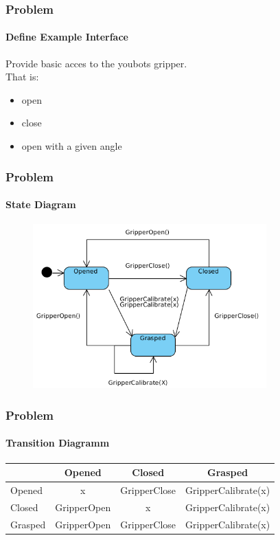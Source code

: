 \documentclass{beamer}
\begin{document}

\begin{frame}
\frametitle{Problem}
  \framesubtitle{Define Example Interface}
  Provide basic acces to the youbots gripper.\\
  That is:
  \begin{itemize}
   \item open
   \item close
   \item open with a given angle 
  \end{itemize}

\end{frame}



\begin{frame}
 \frametitle{Problem}
 \framesubtitle{State Diagram}

 \begin{figure}[ht!]
  \centering
  \includegraphics[width=90mm]{img/statechart.png}
  \caption{}
  \label{State Diagram Of The Gripper}
  \end{figure} 
 \end{frame}
 
 
 \begin{frame}
 \frametitle{Problem}
 \framesubtitle{Transition Diagramm}
 \begin{tabular}{ l | c c c }
            & Opened & Closed & Grasped \\ \hline
  Opened      & x & GripperClose & GripperCalibrate(x) \\
  Closed     & GripperOpen & x  & GripperCalibrate(x) \\
  Grasped     & GripperOpen & GripperClose & GripperCalibrate(x) \\
  
\end{tabular}
\end{frame}
\end{document}
